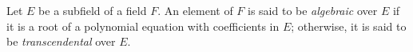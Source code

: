 Let $E$ be a subfield of a field $F$. An element of $F$ is said to be \emph{algebraic} over $E$ if it is a root of a polynomial equation with coefficients in $E$; otherwise, it is said to be \emph{transcendental} over $E$.